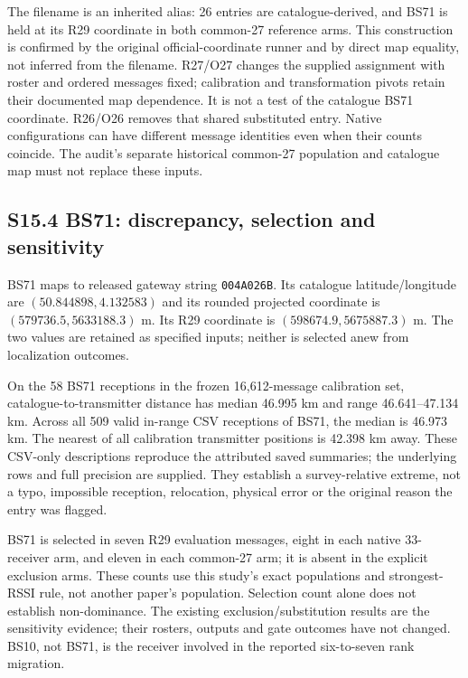 \documentclass[journal,onecolumn,10pt]{IEEEtran}
\begin{document}
The  filename is an inherited alias: 26 entries are catalogue-derived, and BS71 is held at its R29 coordinate in both common-27 reference arms. This construction is confirmed by the original official-coordinate runner and by direct map equality, not inferred from the filename. R27/O27 changes the supplied assignment with roster and ordered messages fixed; calibration and transformation pivots retain their documented map dependence. It is not a test of the catalogue BS71 coordinate. R26/O26 removes that shared substituted entry. Native configurations can have different message identities even when their counts coincide. The audit's separate historical common-27 population and catalogue map must not replace these inputs.

\subsection*{S15.4 BS71: discrepancy, selection and sensitivity}
BS71 maps to released gateway string \texttt{004A026B}. Its catalogue latitude/longitude are $(50.844898,4.132583)$ and its rounded projected coordinate is $(579736.5,5633188.3)$ m. Its R29 coordinate is $(598674.9,5675887.3)$ m. The two values are retained as specified inputs; neither is selected anew from localization outcomes.

On the 58 BS71 receptions in the frozen 16,612-message calibration set, catalogue-to-transmitter distance has median 46.995 km and range 46.641--47.134 km. Across all 509 valid in-range CSV receptions of BS71, the median is 46.973 km. The nearest of all calibration transmitter positions is 42.398 km away. These CSV-only descriptions reproduce the attributed saved summaries; the underlying rows and full precision are supplied. They establish a survey-relative extreme, not a typo, impossible reception, relocation, physical error or the original reason the entry was flagged.

BS71 is selected in seven R29 evaluation messages, eight in each native 33-receiver arm, and eleven in each common-27 arm; it is absent in the explicit exclusion arms. These counts use this study's exact populations and strongest-RSSI rule, not another paper's population. Selection count alone does not establish non-dominance. The existing exclusion/substitution results are the sensitivity evidence; their rosters, outputs and gate outcomes have not changed. BS10, not BS71, is the receiver involved in the reported six-to-seven rank migration.
\end{document}
